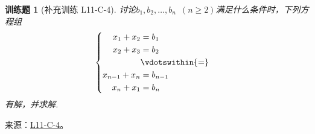 \documentclass[12pt,fontset=fandol]{ctexart}
\newtheorem{exercise}{训练题}[section]
\begin{document}
\begin{exercise}[补充训练 L11-C-4]\label{prob:L11-C-4}
讨论$b_1,b_2,\ldots,b_n\enspace(n \geqslant 2)$满足什么条件时，下列方程组
        \[\begin{cases} \begin{aligned}
                    x_1+x_2     & =b_1            \\
                    x_2+x_3     & =b_2            \\
                                & \vdotswithin{=} \\
                    x_{n-1}+x_n & =b_{n-1}        \\
                    x_n+x_1     & =b_n
                \end{aligned} \end{cases}\]有解，并求解.
\end{exercise}
\noindent 来源：\href{https://github.com/yhwu-is/Linear-Algebra-Left-Undone/blob/new/%E8%AE%B2%E4%B9%89/%E4%B8%93%E9%A2%98/11%20%E6%9C%9D%E8%8A%B1%E5%A4%95%E6%8B%BE.tex}{L11-C-4}。
\end{document}
